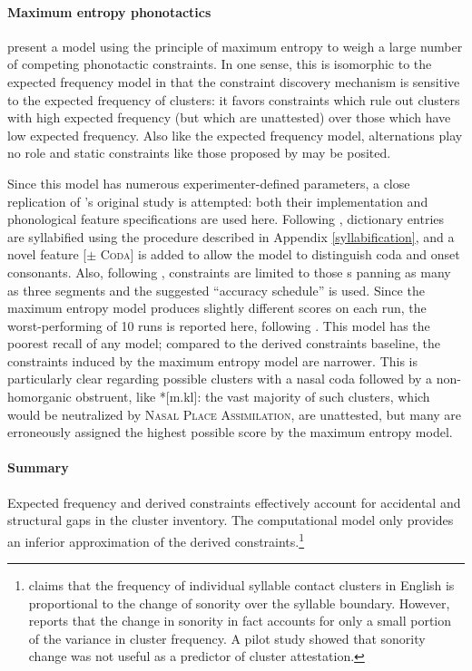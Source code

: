 \paragraph{Maximum entropy phonotactics}
\citet{Hayes2008a} present a model using the principle of maximum entropy to weigh a large number of competing phonotactic constraints.
In one sense, this is isomorphic to the expected frequency model in that the constraint discovery mechanism is sensitive to the expected frequency of clusters: it favors constraints which rule out clusters with high expected frequency (but which are unattested) over those which have low expected frequency.
Also like the expected frequency model, alternations play no role and static constraints like those proposed by \citet{Pierrehumbert1994} may be posited.

Since this model has numerous experimenter-defined parameters, a close replication of \citeauthor{Hayes2008a}'s original study is attempted: both their implementation and phonological feature specifications are used here.
Following \citet{HayesInPress}, dictionary entries are syllabified using the procedure described in Appendix \ref{syllabification}, and a novel feature [$\pm$ \textsc{Coda}] is added to allow the model to distinguish coda and onset consonants.
Also, following \citeauthor{Hayes2008a}, constraints are limited to those s
panning as many as three segments and the suggested ``accuracy schedule'' is used.
Since the maximum entropy model produces slightly different scores on each run, the worst-performing of 10 runs is reported here, following \citeauthor{Hayes2008a}.
This model has the poorest recall of any model; compared to the derived constraints baseline, the constraints induced by the maximum entropy model are narrower.
This is particularly clear regarding possible clusters with a nasal coda followed by a non-homorganic obstruent, like *[m.kl]: the vast majority of such clusters, which would be neutralized by \textsc{Nasal Place Assimilation}, are unattested, but many are erroneously assigned the highest possible score by the maximum entropy model.

\paragraph{Summary}
Expected frequency and derived constraints effectively account for accidental and structural gaps in the cluster inventory.
The \citet{Hayes2008a} computational model only provides an inferior approximation of the derived constraints.\footnote{
    \citet{McGowan2009} claims that the frequency of individual syllable contact clusters in English is proportional to the change of sonority over the syllable boundary.
    However, \citeauthor{McGowan2009} reports that the change in sonority in fact accounts for only a small portion of the variance in cluster frequency.
    A pilot study showed that sonority change was not useful as a predictor of cluster attestation.}


